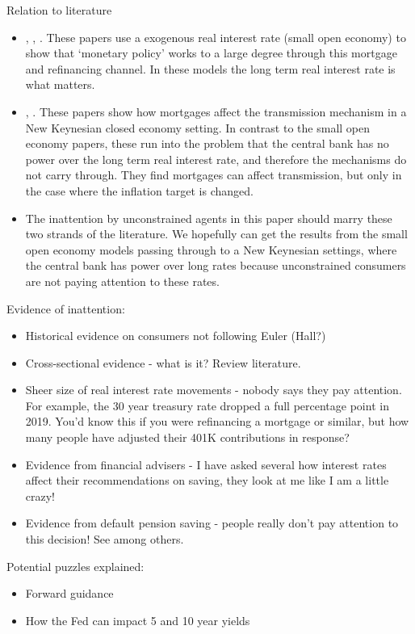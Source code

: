 \documentclass[AER]{AEA}
\begin{document}
Relation to literature
\begin{itemize}
\item \cite{wong_population_2016}, \cite{berger_prepayment_2018}, \cite{eichenbaum_refinance_2018}. These papers use a exogenous real interest rate (small open economy) to show that `monetary policy' works to a large degree through this mortgage and refinancing channel. In these models the long term real interest rate is what matters.
\item \cite{greenwald_mortgage_2018}, \cite{garriga_monk_2019}. These papers show how mortgages affect the transmission mechanism in a New Keynesian closed economy setting. In contrast to the small open economy papers, these run into the problem that the central bank has no power over the long term real interest rate, and therefore the mechanisms do not carry through. They find mortgages can affect transmission, but only in the case where the inflation target is changed.
\item The inattention by unconstrained agents in this paper should marry these two strands of the literature. We hopefully can get the results from the small open economy models passing through to a New Keynesian settings, where the central bank has power over long rates because unconstrained consumers are not paying attention to these rates.
\end{itemize}
Evidence of inattention:
\begin{itemize}
\item Historical evidence on consumers not following Euler (Hall?)
\item Cross-sectional evidence - what is it? Review literature.
\item Sheer size of real interest rate movements - nobody says they pay attention. For example, the 30 year treasury rate dropped a full percentage point in 2019. You'd know this if you were refinancing a mortgage or similar, but how many people have adjusted their 401K contributions in response?
\item Evidence from financial advisers - I have asked several how interest rates affect their recommendations on saving, they look at me like I am a little crazy!
\item Evidence from default pension saving - people really don't pay attention to this decision! See \cite{madrian_power_2001} among others.
\end{itemize}
Potential puzzles explained:
\begin{itemize}
\item Forward guidance
\item How the Fed can impact 5 and 10 year yields
\end{itemize}
\end{document}
